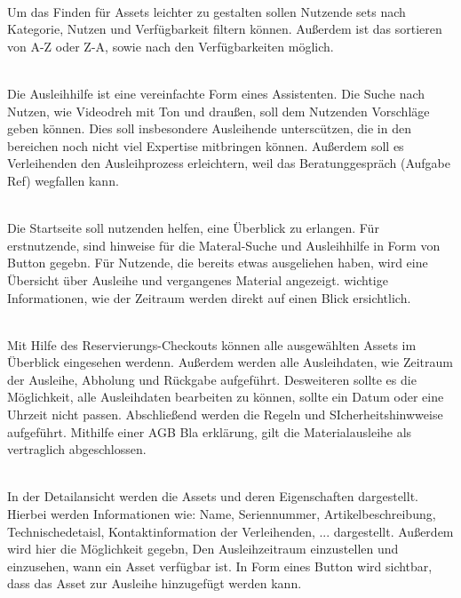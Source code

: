     {\sffamily\color{maincolor}{Ft-A-2 | Filtern und Sortieren }}\\
Um das Finden für Assets leichter zu gestalten sollen Nutzende sets nach
Kategorie, Nutzen und Verfügbarkeit filtern können. Außerdem ist das sortieren
von A-Z oder Z-A, sowie nach den Verfügbarkeiten möglich.

{\sffamily\color{maincolor}{Ft-A-3 | Ausleihhilfe/Nutzensuche  }}\\
Die Ausleihhilfe ist eine vereinfachte Form eines Assistenten. Die Suche nach
Nutzen, wie Videodreh mit Ton und draußen, soll dem Nutzenden Vorschläge geben
können. Dies soll insbesondere Ausleihende unterscützen, die in den bereichen
noch nicht viel Expertise mitbringen können. Außerdem soll es Verleihenden den
Ausleihprozess erleichtern, weil das Beratunggespräch (Aufgabe Ref) wegfallen
kann.

    {\sffamily\color{maincolor}{Ft-A-4 | Startseite }}\\
Die Startseite soll nutzenden helfen, eine  Überblick zu erlangen. Für
erstnutzende, sind hinweise für die Materal-Suche und Ausleihhilfe in Form von
Button gegebn. Für Nutzende, die bereits etwas ausgeliehen haben, wird eine
Übersicht über Ausleihe und vergangenes Material angezeigt. wichtige
Informationen, wie der Zeitraum werden direkt auf einen Blick ersichtlich.

    {\sffamily\color{maincolor}{Ft-A-5 | Reservierungs-Checkout }}\\
Mit Hilfe des Reservierungs-Checkouts können alle ausgewählten Assets im
Überblick eingesehen werdenn. Außerdem werden alle Ausleihdaten, wie Zeitraum
der Ausleihe, Abholung und Rückgabe aufgeführt. Desweiteren sollte es die
Möglichkeit, alle Ausleihdaten bearbeiten zu können, sollte ein Datum oder eine
Uhrzeit nicht passen. Abschließend werden die Regeln und SIcherheitshinwweise
aufgeführt. Mithilfe einer AGB Bla erklärung, gilt die Materialausleihe als
vertraglich abgeschlossen.

    {\sffamily\color{maincolor}{Ft-A-6 | Detailsansicht }}\\
In der Detailansicht werden die Assets und deren Eigenschaften dargestellt.
Hierbei werden Informationen wie: Name, Seriennummer, Artikelbeschreibung,
Technischedetaisl, Kontaktinformation der Verleihenden, ... dargestellt.
Außerdem wird hier die Möglichkeit gegebn, Den Ausleihzeitraum einzustellen und
einzusehen, wann ein Asset verfügbar ist. In Form eines Button wird sichtbar,
dass das Asset zur Ausleihe hinzugefügt werden kann.

